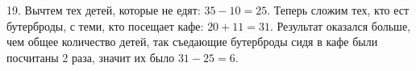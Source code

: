 19. Вычтем тех детей, которые не едят: $35-10=25.$ Теперь сложим тех, кто ест бутерброды, с теми, кто посещает кафе: $20+11=31.$ Результат оказался больше, чем общее количество детей, так съедающие бутерброды сидя в кафе были посчитаны 2 раза, значит их было $31-25=6.$\\

